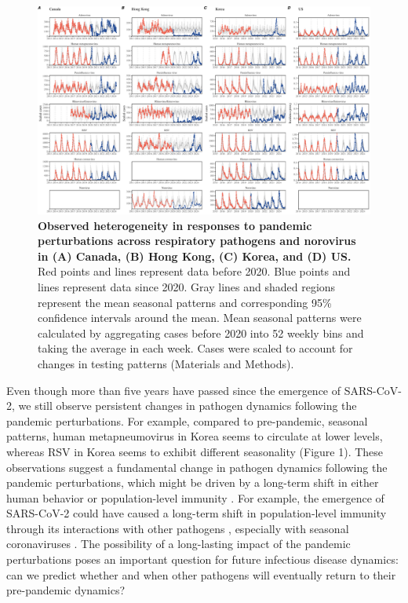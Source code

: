 \documentclass[12pt]{article}
\begin{document}
\begin{figure}[!th]
\includegraphics[width=\textwidth]{../figure1/figure1.pdf}
\caption{
\textbf{Observed heterogeneity in responses to pandemic perturbations across respiratory pathogens and norovirus in (A) Canada, (B) Hong Kong, (C) Korea, and (D) US.}
Red points and lines represent data before 2020.
Blue points and lines represent data since 2020.
Gray lines and shaded regions represent the mean seasonal patterns and corresponding 95\% confidence intervals around the mean.
Mean seasonal patterns were calculated by aggregating cases before 2020 into 52 weekly bins and taking the average in each week.
Cases were scaled to account for changes in testing patterns (Materials and Methods).
}
\end{figure} 

Even though more than five years have passed since the emergence of SARS-CoV-2, we still observe persistent changes in pathogen dynamics following the pandemic perturbations.
For example, compared to pre-pandemic, seasonal patterns, human metapneumovirus in Korea seems to circulate at lower levels, whereas RSV in Korea seems to exhibit different seasonality (Figure 1).
These observations suggest a fundamental change in pathogen dynamics following the pandemic perturbations, which might be driven by a long-term shift in either human behavior or population-level immunity \citep{kissler2020projecting,baker2022long}.
For example, the emergence of SARS-CoV-2 could have caused a long-term shift in population-level immunity through its interactions with other pathogens \citep{swets2022sars}, especially with seasonal coronaviruses \citep{kissler2020projecting,lin2022pre,murray2023impact}.
The possibility of a long-lasting impact of the pandemic perturbations poses an important question for future infectious disease dynamics: can we predict whether and when other pathogens will eventually return to their pre-pandemic dynamics?
\end{document}

